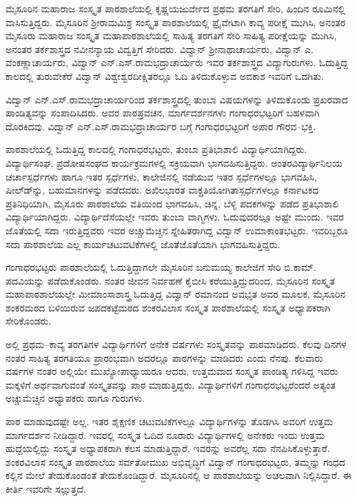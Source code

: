 ಮೈಸೂರಿನ ಮಹಾರಾಜ ಸಂಸ್ಕೃತ ಪಾಠಶಾಲೆಯಲ್ಲಿ ಕೃಷ್ಣಯಜುರ್ವೇದ ಪ್ರಥಮ ತರಗತಿಗೆ ಸೇರಿ, ಹಿಂದಿನ ರೂಮಿನಲ್ಲಿ ವಾಸಿಸುತ್ತಿದ್ದರು. ಮೈಸೂರಿನ ಶ್ರೀರಾಮಮಿಶ್ರ ಸಂಸ್ಕೃತ ಪಾಠಶಾಲೆಯಲ್ಲಿ ಪ್ರೈವೇಟಾಗಿ ಕಾವ್ಯ ಪರೀಕ್ಷೆ ಮುಗಿಸಿ, ಅನಂತರ ಮೈಸೂರು ಮಹಾರಾಜ ಸಂಸ್ಕೃತ ಮಹಾಪಾಠಶಾಲೆಯಲ್ಲಿ ಸಾಹಿತ್ಯ ತರಗತಿಗೆ ಸೇರಿ ಸಾಹಿತ್ಯ ಪರೀಕ್ಷೆಯನ್ನು ಮುಗಿಸಿ, ಅನಂತರ ತರ್ಕಶಾಸ್ತ್ರದ ನವೀನನ್ಯಾಯ ವಿದ್ವತ್ತಿಗೆ ಸೇರಿದರು. ವಿದ್ವಾನ್ ಶ್ರೀನಾಥಾಚಾರ್ಯರು, ವಿದ್ವಾನ್ ಎ. ವೆಂಕಣ್ಣಾಚಾರ್ಯರು, ವಿದ್ವಾನ್ ಎನ್.ಎಸ್.ರಾಮಭದ್ರಾಚಾರ್ಯರು ಇವರ ತರ್ಕಶಾಸ್ತ್ರದ ವಿದ್ಯಾಗುರುಗಳು. ಓದುತ್ತಿದ್ದ ಕಾಲದಲ್ಲಿ ತುರುವೇಕೆರೆ ವಿದ್ವಾನ್ ವಿಶ್ವೇಶ್ವರದೀಕ್ಷಿತರಲ್ಲೂ ಓದಿ ತಿಳಿದುಕೊಳ್ಳುವ ಅವಕಾಶ ಇವರಿಗೆ ಒದಗಿತು. 

ವಿದ್ವಾನ್ ಎನ್.ಎಸ್.ರಾಮಭದ್ರಾಚಾರ್ಯರಿಂದ ತರ್ಕಶಾಸ್ತ್ರದಲ್ಲಿ ತುಂಬಾ ವಿಷಯಗಳನ್ನು ತಿಳಿದುಕೊಂಡು ಪ್ರಖರವಾದ ಪಾಂಡಿತ್ಯವನ್ನು ಸಂಪಾದಿಸಿದರು. ಅವರ ಪಾಠಪ್ರವಚನ, ಮಾರ್ಗದರ್ಶನಗಳು ಗಂಗಾಧರಭಟ್ಟರಿಗೆ ಬಹಳವಾಗಿ ದೊರಕಿದವು. ವಿದ್ವಾನ್ ಎನ್.ಎಸ್.ರಾಮಭದ್ರಾಚಾರ್ಯರ ಬಗ್ಗೆ ಗಂಗಾಧರಭಟ್ಟರಿಗೆ ಅಪಾರ ಗೌರವ–ಭಕ್ತಿ.

ಪಾಠಶಾಲೆಯಲ್ಲಿ ಓದುತ್ತಿದ್ದ ಕಾಲದಲ್ಲಿ ಗಂಗಾಧರಭಟ್ಟರು, ತುಂಬಾ ಪ್ರತಿಭಾಶಾಲಿ ವಿದ್ಯಾರ್ಥಿಯಾಗಿದ್ದರು. ವಿದ್ಯಾರ್ಥಿಸಂಘ, ಪ್ರದೋಷಸಂಘದ ಕಾರ್ಯಕ್ರಮಗಳಲ್ಲಿ ಸಕ್ರಿಯವಾಗಿ ಭಾಗವಹಿಸುತ್ತಿದ್ದರು. ಅಂತರವಿದ್ಯಾರ್ಥಿನಿಲಯ ಚರ್ಚಾಸ್ಪರ್ಧೆಗಳು ಹಾಗೂ ಇತರ ಸ್ಪರ್ಧೆಗಳು, ಕಾಲೇಜಿನಲ್ಲಿ ನಡೆಯುವ ಇತರ ಸ್ಪರ್ಧೆಗಳಲ್ಲೂ ಭಾಗವಹಿಸಿ, ಷೀಲ್ಡ್‍ನ್ನು, ಬಹುಮಾನಗಳನ್ನು ಪಡೆದವರು. ಅಖಿಲಭಾರತ ವಾಕ್ಪ್ರತಿಯೋಗಿತಾಸ್ಪರ್ಧೆಗಳಲ್ಲೂ ಕರ್ನಾಟಕದ ಪ್ರತಿನಿಧಿಯಾಗಿ, ಮೈಸೂರು ಪಾಠಶಾಲೆಯ ವತಿಯಿಂದ ಭಾಗವಹಿಸಿ, ಚಿನ್ನ, ಬೆಳ್ಳಿ ಪದಕಗಳನ್ನು ಪಡೆದ ಪ್ರತಿಭಾಶಾಲಿ ವಿದ್ಯಾರ್ಥಿಯಾಗಿದ್ದರು. ವಿದ್ಯಾರ್ಥಿದೆಸೆಯಲ್ಲೇ ಇವರು ತುಂಬಾ ವಾಗ್ಮಿಗಳು. ಓದುವುದರಲ್ಲೂ ಅಷ್ಟೇ ಮುಂದು. ಇವರ ಜೊತೆಯಲ್ಲಿ ಸದಾ ಇರುತ್ತಿದ್ದವರು ಇವರ ಅಚ್ಚುಮೆಚ್ಚಿನ ಸ್ನೇಹಿತರಾಗಿದ್ದ ವಿದ್ವಾನ್ ಉಮಾಕಾಂತಭಟ್ಟರು. ಇವರಿಬ್ಬರೂ ಸದಾ ಪಾಠಶಾಲೆಯ ಎಲ್ಲ ಕಾರ್ಯಚಟುವಟಿಕೆಗಳಲ್ಲಿ ಜೊತೆಜೊತೆಯಾಗಿ ಭಾಗವಹಿಸುತ್ತಿದ್ದರು.

ಗಂಗಾಧರಭಟ್ಟರು ಪಾಠಶಾಲೆಯಲ್ಲಿ ಓದುತ್ತಿದ್ದಾಗಲೇ ಮೈಸೂರಿನ ಬನುಮಯ್ಯ ಕಾಲೇಜಿಗೆ ಸೇರಿ ಬಿ.ಕಾಮ್. ಪದವಿಯನ್ನು ಪಡೆದುಕೊಂಡರು. ನಂತರ ಜೀವನ ನಿರ್ವಹಣೆ ಕೈಬೀಸಿ ಕರೆಯುತ್ತಿದ್ದುದರಿಂದ, ಮೈಸೂರಿನ ಸಂಸ್ಕೃತ ಮಹಾಪಾಠಶಾಲೆಯಲ್ಲೇ ಮೀಮಾಂಸಾಶಾಸ್ತ್ರ ಓದುತ್ತಿದ್ದ ವಿದ್ವಾನ್ ರಮಾನಂದ ಅವಭೃತ ಅವರ ಮೂಲಕ, ಮೈಸೂರಿನ ಶಂಕರಮಠದ ಬಳಿಯಿರುವ ಜಪದಕಟ್ಟೆಮಠದ ಶಂಕರವಿಲಾಸ ಸಂಸ್ಕೃತ ಪಾಠಶಾಲೆಯಲ್ಲಿ ಸಂಸ್ಕೃತ ಅಧ್ಯಾಪಕರಾಗಿ ಸೇರಿಕೊಂಡರು.

ಅಲ್ಲಿ ಪ್ರಥಮ–ಕಾವ್ಯ ತರಗತಿಗಳ ವಿದ್ಯಾರ್ಥಿಗಳಿಗೆ ಅನೇಕ ವರ್ಷಗಳು ಸಂಸ್ಕೃತವನ್ನು ಪಾಠಮಾಡಿದರು. ಕೆಲವು ದಿನಗಳ ನಂತರ ಸಾಹಿತ್ಯ ತರಗತಿಯೂ ಪ್ರಾರಂಭವಾಗಿ ಅದರಲ್ಲೂ ಪಾಠಗಳನ್ನು ಮಾಡಿದರು ಎಂದು ನೆನಪು. ಕೆಲವಾರು ವರ್ಷಗಳ ನಂತರ ಅಲ್ಲಿಯೇ ಮುಖ್ಯೋಪಾಧ್ಯಾಯರೂ ಆದರು. ಉತ್ತಮವಾದ ಸಂಸ್ಕೃತ ಪಾಂಡಿತ್ಯ ಗಳಿಸಿದ್ದ ಇವರು ಮಕ್ಕಳಿಗೆ ಅರ್ಥವಾಗುವಂತೆ ಸಂಸ್ಕೃತವನ್ನು ಪಾಠ ಮಾಡುತ್ತಿದ್ದರು. ವಿದ್ಯಾರ್ಥಿಗಳಿಗೆ ಗಂಗಾಧರಭಟ್ಟರೆಂದರೆ ಅತ್ಯಂತ ಅಚ್ಚುಮೆಚ್ಚಿನ ಅಧ್ಯಾಪಕರು ಹಾಗೂ ಗುರುಗಳು. 

ಪಾಠ ಮಾಡುವುದಷ್ಟೇ ಅಲ್ಲ. ಇತರ ಶೈಕ್ಷಣಿಕ ಚಟುವಟಿಕೆಗಳಲ್ಲೂ ವಿದ್ಯಾರ್ಥಿಗಳನ್ನು ತೊಡಗಿಸಿ ಅವರಿಗೆ ಉತ್ತಮ ಮಾರ್ಗದರ್ಶನ ನೀಡಿದ್ದಾರೆ. ಇವರಲ್ಲಿ ಸಂಸ್ಕೃತ ಓದಿದ ನೂರಾರು ವಿದ್ಯಾರ್ಥಿಗಳಲ್ಲಿ ಅನೇಕರು ಇಂದು ಉತ್ತಮ ಹುದ್ದೆಯಲ್ಲಿದ್ದು ಸಂಸ್ಕೃತ ಅಧ್ಯಾಪಕರಾಗಿ ಕೆಲಸ ಮಾಡುತ್ತಿದ್ದಾರೆ. ಇವರನ್ನು ಅವರೆಲ್ಲ ಸದಾ ನೆನಪಿಸಿಕೊಳ್ಳುತ್ತಾರೆ. ಶಂಕರವಿಲಾಸ ಸಂಸ್ಕೃತ ಪಾಠಶಾಲೆಯ ಸರ್ವತೋಮುಖ ಅಭಿವೃದ್ಧಿಗೆ ವಿದ್ವಾನ್ ಗಂಗಾಧರಭಟ್ಟರು, ತಮ್ಮನ್ನು ಗಂಧದ ಕಲ್ಲಿನ ಮೇಲೆ ತೇದುಕೊಂಡಂತೆ ತೇದುಕೊಂಡಿದ್ದಾರೆ. ಮೈಸೂರಿನಲ್ಲಿ ಆ ಪಾಠಶಾಲೆಯನ್ನು ಅಚಲವಾಗಿ ನಿಲ್ಲಿಸಿದ್ದಾರೆ. ಈ ಕೀರ್ತಿ ಇವರಿಗೇ ಸಲ್ಲುತ್ತದೆ.

